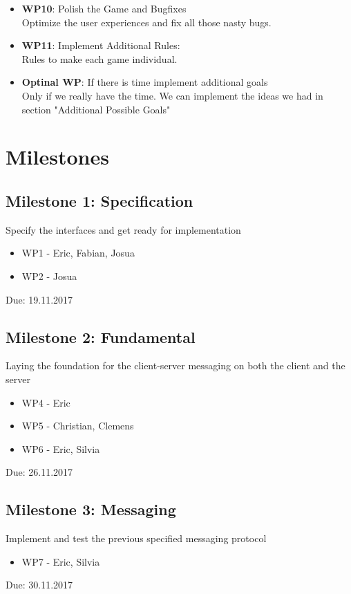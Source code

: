 \documentclass{sig-alternate}
\begin{document}
\begin{itemize}
		\item {\bf WP10}: Polish the Game and Bugfixes\\
		Optimize the user experiences and fix all those nasty bugs.
		
		\item {\bf WP11}: Implement Additional Rules:\\
		Rules to make each game individual.
		
		\item {\bf Optinal WP}: If there is time implement additional goals\\
        Only if we really have the time. We can implement the ideas we had in section "Additional Possible Goals"
        
\end{itemize}

\section{Milestones}

\subsection{Milestone 1: Specification}
Specify the interfaces and get ready for implementation
\begin{itemize}
	\item WP1 - Eric, Fabian, Josua
	\item WP2 - Josua
\end{itemize}
Due: 19.11.2017

\subsection{Milestone 2: Fundamental}
Laying the foundation for the client-server messaging on both the client and the server
\begin{itemize}
	\item WP4 - Eric
	\item WP5 - Christian, Clemens
	\item WP6 - Eric, Silvia
\end{itemize}
Due: 26.11.2017
	
\subsection{Milestone 3: Messaging}
Implement and test the previous specified messaging protocol
\begin{itemize}
	\item WP7 - Eric, Silvia
\end{itemize}
Due: 30.11.2017
\end{document}
